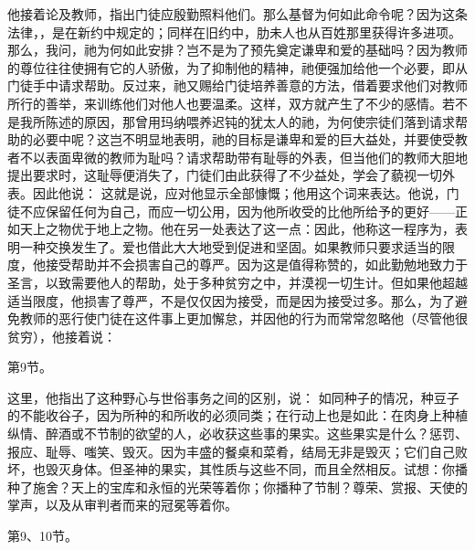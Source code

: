 他接着论及教师，指出门徒应殷勤照料他们。那么基督为何如此命令呢？因为这条法律，，是在新约中规定的；同样在旧约中，肋未人也从百姓那里获得许多进项。那么，我问，祂为何如此安排？岂不是为了预先奠定谦卑和爱的基础吗？因为教师的尊位往往使拥有它的人骄傲，为了抑制他的精神，祂便强加给他一个必要，即从门徒手中请求帮助。反过来，祂又赐给门徒培养善意的方法，借着要求他们对教师所行的善举，来训练他们对他人也要温柔。这样，双方就产生了不少的感情。若不是我所陈述的原因，那曾用玛纳喂养迟钝的犹太人的祂，为何使宗徒们落到请求帮助的必要中呢？这岂不明显地表明，祂的目标是谦卑和爱的巨大益处，并要使受教者不以表面卑微的教师为耻吗？请求帮助带有耻辱的外表，但当他们的教师大胆地提出要求时，这耻辱便消失了，门徒们由此获得了不少益处，学会了藐视一切外表。因此他说： 这就是说，应对他显示全部慷慨；他用这个词来表达。他说，门徒不应保留任何为自己，而应一切公用，因为他所收受的比他所给予的更好——正如天上之物优于地上之物。他在另一处表达了这一点：因此，他称这一程序为，表明一种交换发生了。爱也借此大大地受到促进和坚固。如果教师只要求适当的限度，他接受帮助并不会损害自己的尊严。因为这是值得称赞的，如此勤勉地致力于圣言，以致需要他人的帮助，处于多种贫穷之中，并漠视一切生计。但如果他超越适当限度，他损害了尊严，不是仅仅因为接受，而是因为接受过多。那么，为了避免教师的恶行使门徒在这件事上更加懈怠，并因他的行为而常常忽略他（尽管他很贫穷），他接着说：\par

第9节。\par

这里，他指出了这种野心与世俗事务之间的区别，说： 如同种子的情况，种豆子的不能收谷子，因为所种的和所收的必须同类；在行动上也是如此：在肉身上种植纵情、醉酒或不节制的欲望的人，必收获这些事的果实。这些果实是什么？惩罚、报应、耻辱、嗤笑、毁灭。因为丰盛的餐桌和菜肴，结局无非是毁灭；它们自己败坏，也毁灭身体。但圣神的果实，其性质与这些不同，而且全然相反。试想：你播种了施舍？天上的宝库和永恒的光荣等着你；你播种了节制？尊荣、赏报、天使的掌声，以及从审判者而来的冠冕等着你。\par

第9、10节。\par

